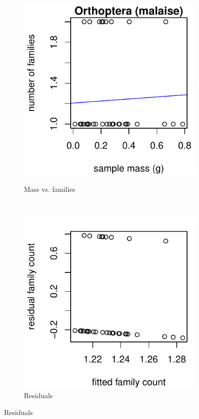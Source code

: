 \documentclass[10pt,letterpaper,twocolumn]{article}
\begin{document}
\begin{figure}[h]
	\centering
	\begin{subfigure}[b]{0.15\textwidth}
		\caption{Mass vs. families}
		\includegraphics[width=\textwidth]{plots/mass-vs-count/scatter/2015_malaise_Orthoptera_mass-vs-count.pdf}
		\label{fig:malaise_orthoptera_scatter}
	\end{subfigure}
	~
	\begin{subfigure}[b]{0.15\textwidth}
		\caption{Residuals}
		\includegraphics[width=\textwidth]{plots/mass-vs-count/residual/2015_malaise_Orthoptera_residual.pdf}

\end{subfigure}
\end{figure}
\end{document}
